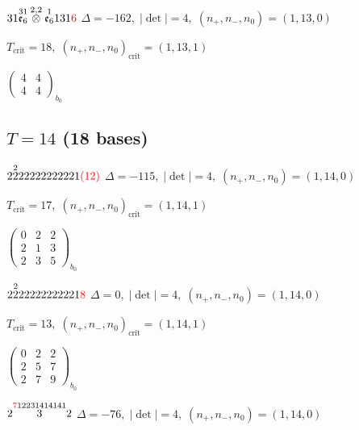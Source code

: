 \documentclass[10pt]{article}
\begin{document}
\smallskip

$31\overset{31}{\mathfrak{e}_6}\overset{2,2}{\otimes}\overset{1}{\mathfrak{e}_6}131\textcolor{red}{6}$ \quad $\Delta=-162,\; |\det|=4,\; (n_+,n_-,n_0)=(1,13,0)$

\hspace{1em}$T_{\text{crit}}=18,\; (n_+,n_-,n_0)_{\text{crit}}=(1,13,1)$

\hspace{2em}$\left(\begin{smallmatrix}4 & 4 \\ 4 & 4\end{smallmatrix}\right)_{\!b_0}$


\subsection*{$T = 14$ \quad (18 bases)}
\smallskip

$2\overset{2}{2}22222222221\textcolor{red}{(12)}$ \quad $\Delta=-115,\; |\det|=4,\; (n_+,n_-,n_0)=(1,14,0)$

\hspace{1em}$T_{\text{crit}}=17,\; (n_+,n_-,n_0)_{\text{crit}}=(1,14,1)$

\hspace{2em}$\left(\begin{smallmatrix}0 & 2 & 2 \\ 2 & 1 & 3 \\ 2 & 3 & 5\end{smallmatrix}\right)_{\!b_0}$

$2\overset{2}{2}22222222221\textcolor{red}{8}$ \quad $\Delta=0,\; |\det|=4,\; (n_+,n_-,n_0)=(1,14,0)$

\hspace{1em}$T_{\text{crit}}=13,\; (n_+,n_-,n_0)_{\text{crit}}=(1,14,1)$

\hspace{2em}$\left(\begin{smallmatrix}0 & 2 & 2 \\ 2 & 5 & 7 \\ 2 & 7 & 9\end{smallmatrix}\right)_{\!b_0}$

\smallskip

$2\overset{\textcolor{red}{7}12231414141}{3}2$ \quad $\Delta=-76,\; |\det|=4,\; (n_+,n_-,n_0)=(1,14,0)$
\end{document}
